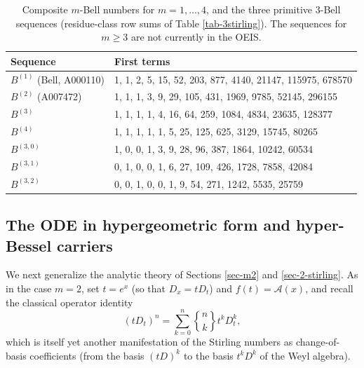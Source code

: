 \documentclass[a4paper]{amsart}
\numberwithin{equation}{section}
\newcommand{\Stirling}[0]{\genfrac\{\}{0pt}{}}
\begin{document}
\begin{table}[htbp]
    \centering
    \begin{tabular}{|l|l|}
    \hline
    Sequence & First terms \\
    \hline
    $B^{(1)}$ (Bell, A000110) & 1, 1, 2, 5, 15, 52, 203, 877, 4140, 21147, 115975, 678570 \\
    $B^{(2)}$ (A007472) & 1, 1, 1, 3, 9, 29, 105, 431, 1969, 9785, 52145, 296155 \\
    $B^{(3)}$ & 1, 1, 1, 1, 4, 16, 64, 259, 1084, 4834, 23635, 128377 \\
    $B^{(4)}$ & 1, 1, 1, 1, 1, 5, 25, 125, 625, 3129, 15745, 80265 \\
    \hline
    $B^{(3,0)}$ & 1, 0, 0, 1, 3, 9, 28, 96, 387, 1864, 10242, 60534 \\
    $B^{(3,1)}$ & 0, 1, 0, 0, 1, 6, 27, 109, 426, 1728, 7858, 42084 \\
    $B^{(3,2)}$ & 0, 0, 1, 0, 0, 1, 9, 54, 271, 1242, 5535, 25759 \\
    \hline
    \end{tabular}
    \bigskip
    \caption{Composite $m$-Bell numbers for $m = 1, \ldots, 4$, and the three primitive $3$-Bell sequences (residue-class row sums of Table \ref{tab-3stirling}). The sequences for $m \ge 3$ are not currently in the OEIS.}
    \label{tab-mbell-numbers}
\end{table}

\subsection{The ODE in hypergeometric form and hyper-Bessel carriers}

We next generalize the analytic theory of Sections \ref{sec-m2} and \ref{sec-2-stirling}. As in the case $m=2$, set $t=e^x$ (so that $D_x = tD_t$) and $f(t)=\mathcal{A}(x)$, and recall the classical operator identity \cite{comtet1974, dattoliTouchardPolynomialsGeneralized2010}
\begin{equation}\label{eq-xd-operator-identity}
    (tD_t)^n = \sum_{k=0}^{n}\Stirling{n}{k}t^kD_t^k,
\end{equation}
which is itself yet another manifestation of the Stirling numbers as change-of-basis coefficients (from the basis $(tD)^k$ to the basis $t^kD^k$ of the Weyl algebra).
\end{document}
